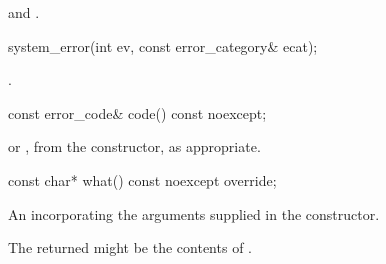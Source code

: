\begin{itemdescr}

\pnum
\ensures \raggedright {} and\linebreak
{}.
\end{itemdescr}

%
\begin{itemdecl}
system_error(int ev, const error_category& ecat);
\end{itemdecl}

\begin{itemdescr}

\pnum
\ensures {}.
\end{itemdescr}

%
\begin{itemdecl}
const error_code& code() const noexcept;
\end{itemdecl}

\begin{itemdescr}
\pnum
\returns {} or , from the constructor,
as appropriate.
\end{itemdescr}

%
\begin{itemdecl}
const char* what() const noexcept override;
\end{itemdecl}

\begin{itemdescr}
\pnum
\returns An \ntbs{} incorporating the arguments supplied in the constructor.

\begin{note} The returned \ntbs{} might be the contents of .\end{note}
\end{itemdescr}
